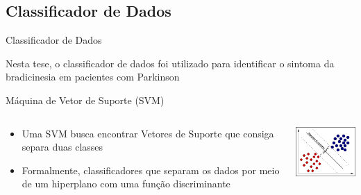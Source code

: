 \documentclass{beamer}
\begin{document}
\subsection{Classificador de Dados}
\begin{frame}{Classificador de Dados}
\begin{block}{}
			Nesta tese, o classificador de dados foi utilizado para identificar o sintoma da bradicinesia em pacientes com Parkinson
			
\end{block}

\end{frame}



\begin{frame}{Máquina de Vetor de Suporte (SVM)}
   \begin{block}{}
   
   \begin{columns}[c]
     \begin{column}{0.5\linewidth}
			 \begin{itemize}
			        \item Uma SVM busca encontrar Vetores de Suporte que consiga separa duas classes
			        

				\item Formalmente, classificadores que separam os dados por meio de um hiperplano com uma função discriminante
			\end{itemize}
     \end{column}

     \begin{column}{0.5\linewidth}
				\includegraphics[width=4cm]{img/svmhyperplane.png}
    \end{column}
\end{columns}
\end{block}
\end{frame}




\end{document}
